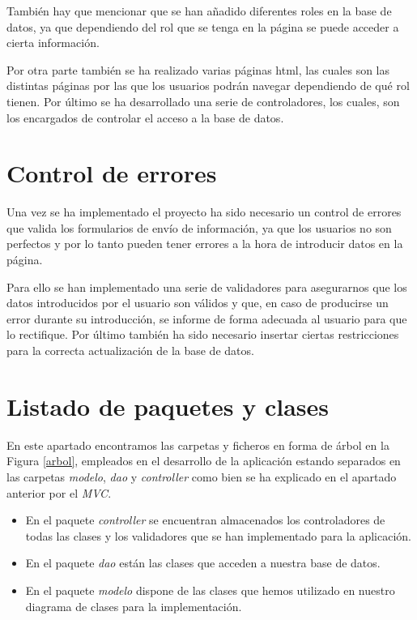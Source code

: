\documentclass[pdftex,11pt,a4paper]{book}
\begin{document}
También hay que mencionar que se han añadido diferentes roles en la base de datos, ya que dependiendo del rol que se tenga en la página se puede acceder a cierta información.

Por otra parte también se ha realizado varias páginas html, las cuales son las distintas páginas por las que los usuarios podrán navegar dependiendo de qué rol tienen. Por último se ha desarrollado una serie de controladores, los cuales, son los encargados de controlar el acceso a la base de datos.

\section{Control de errores}

Una vez se ha implementado el proyecto ha sido necesario un control de errores que valida los formularios de envío de información, ya que los usuarios no son perfectos y por lo tanto pueden tener errores a la hora de introducir datos en la página. 

Para ello se han implementado una serie de validadores para asegurarnos que los datos introducidos por el usuario son válidos y que, en caso de producirse un error durante su introducción, se informe de forma adecuada al usuario para que lo rectifique. Por último también ha sido necesario insertar ciertas restricciones para la correcta actualización de la base de datos. 

\section{Listado de paquetes y clases}

En este apartado encontramos las carpetas y ficheros en forma de árbol en la Figura \ref{arbol}, empleados en el desarrollo de la aplicación estando separados en las carpetas \emph{modelo}, \emph{dao} y \emph{controller} como bien se ha explicado en el apartado anterior por el \emph{MVC}.

\begin{itemize}
\item En el paquete \emph{controller} se encuentran almacenados los controladores de todas las clases y los validadores que se han implementado para la aplicación.
\item En el paquete \emph{dao} están las clases que acceden a nuestra base de datos.
\item En el paquete \emph{modelo} dispone de las clases que hemos utilizado en nuestro diagrama de clases para la implementación.
\end{itemize}
\end{document}
